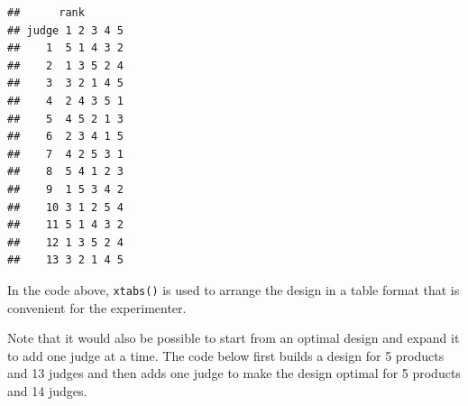 \documentclass[
]{krantz}
\makeatletter
\newenvironment{Shaded}{\begin{snugshade}}{\end{snugshade}}
\newcommand{\AttributeTok}[1]{\textcolor[rgb]{0.61,0.61,0.61}{#1}}
\newcommand{\ConstantTok}[1]{\textcolor[rgb]{0,0,0}{#1}}
\newcommand{\DecValTok}[1]{\textcolor[rgb]{0.06,0.06,0.06}{#1}}
\newcommand{\FunctionTok}[1]{\textcolor[rgb]{0,0,0}{#1}}
\newcommand{\NormalTok}[1]{#1}
\newcommand{\OtherTok}[1]{\textcolor[rgb]{0.37,0.37,0.37}{#1}}
\newcommand{\SpecialCharTok}[1]{\textcolor[rgb]{0,0,0}{#1}}
\newenvironment{kframe}{%
\medskip{}
\setlength{\fboxsep}{.8em}
 \def\at@end@of@kframe{}%
 \ifinner\ifhmode%
  \def\at@end@of@kframe{\end{minipage}}%
  \begin{minipage}{\columnwidth}%
 \fi\fi%
 \def\FrameCommand##1{\hskip\@totalleftmargin \hskip-\fboxsep
 \colorbox{shadecolor}{##1}\hskip-\fboxsep
     \hskip-\linewidth \hskip-\@totalleftmargin \hskip\columnwidth}%
 \MakeFramed {\advance\hsize-\width
   \@totalleftmargin\z@ \linewidth\hsize
   \@setminipage}}%
 {\par\unskip\endMakeFramed%
 \at@end@of@kframe}
\renewenvironment{Shaded}{\begin{kframe}}{\end{kframe}}
\makeatother
\begin{document}
\begin{Shaded}
\end{Shaded}

\begin{verbatim}
##      rank
## judge 1 2 3 4 5
##    1  5 1 4 3 2
##    2  1 3 5 2 4
##    3  3 2 1 4 5
##    4  2 4 3 5 1
##    5  4 5 2 1 3
##    6  2 3 4 1 5
##    7  4 2 5 3 1
##    8  5 4 1 2 3
##    9  1 5 3 4 2
##    10 3 1 2 5 4
##    11 5 1 4 3 2
##    12 1 3 5 2 4
##    13 3 2 1 4 5
\end{verbatim}

In the code above, \texttt{xtabs()} is used to arrange the design in a table format that is convenient for the experimenter.

Note that it would also be possible to start from an optimal design and expand it to add one judge at a time. The code below first builds a design for 5 products and 13 judges and then adds one judge to make the design optimal for 5 products and 14 judges.
\end{document}
